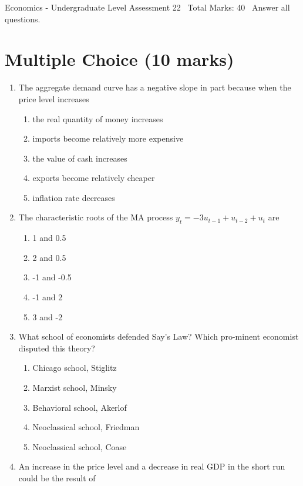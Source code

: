 \documentclass[12pt]{article}
\begin{document}
\begin{center}
Economics - Undergraduate Level Assessment 22 \
Total Marks: 40 \
Answer all questions.
\end{center}

\section*{Multiple Choice (10 marks)}
\begin{enumerate}[label=\arabic*.]
\item The aggregate demand curve has a negative slope in part because when the price level increases
\begin{enumerate}[label=(\alph*)]
    \item the real quantity of money increases
    \item imports become relatively more expensive
    \item the value of cash increases
    \item exports become relatively cheaper
    \item inflation rate decreases
\end{enumerate}
\item The characteristic roots of the MA process $y_t = -3 u_{t-1} + u_{t-2} + u_t$ are
\begin{enumerate}[label=(\alph*)]
    \item 1 and 0.5
    \item 2 and 0.5
    \item -1 and -0.5
    \item -1 and 2
    \item 3 and -2
\end{enumerate}
\item What school of economists defended Say's Law? Which pro-minent economist disputed this theory?
\begin{enumerate}[label=(\alph*)]
    \item Chicago school, Stiglitz
    \item Marxist school, Minsky
    \item Behavioral school, Akerlof
    \item Neoclassical school, Friedman
    \item Neoclassical school, Coase
\end{enumerate}
\item An increase in the price level and a decrease in real GDP in the short run could be the result of
\begin{enumerate}[label=(\alph*)]

\end{enumerate}
\end{enumerate}
\end{document}
